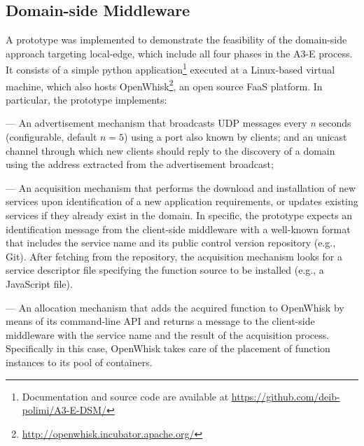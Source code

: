 \subsection{Domain-side Middleware}


A prototype was implemented to demonstrate the feasibility of the domain-side approach targeting local-edge, which include all four phases in the A3-E process. It consists of a simple python application\footnote{Documentation and source code are available at \url{https://github.com/deib-polimi/A3-E-DSM/}} executed at a Linux-based virtual machine, which also hosts OpenWhisk\footnote{\url{http://openwhisk.incubator.apache.org/}}, an open source FaaS platform. In particular, the prototype implements:

--- An advertisement mechanism that broadcasts UDP messages every \textit{n} seconds (configurable, default $n=5$) using a port also known by clients; and an unicast channel through which new clients should reply to the discovery of a domain using the address extracted from the advertisement broadcast;

--- An acquisition mechanism that performs the download and installation of new services upon identification of a new application requirements, or updates existing services if they already exist in the domain. In specific, the prototype expects an identification message from the client-side middleware with a well-known format that includes the service name and its public control version repository (e.g., Git). After fetching from the repository, the acquisition mechanism looks for a service descriptor file specifying the function source to be installed (e.g., a JavaScript file). 

--- An allocation mechanism that adds the acquired function to OpenWhisk by means of its command-line API and returns a message to the client-side middleware with the service name and the result of the acquisition process. Specifically in this case, OpenWhisk takes care of the placement of function instances to its pool of containers.


